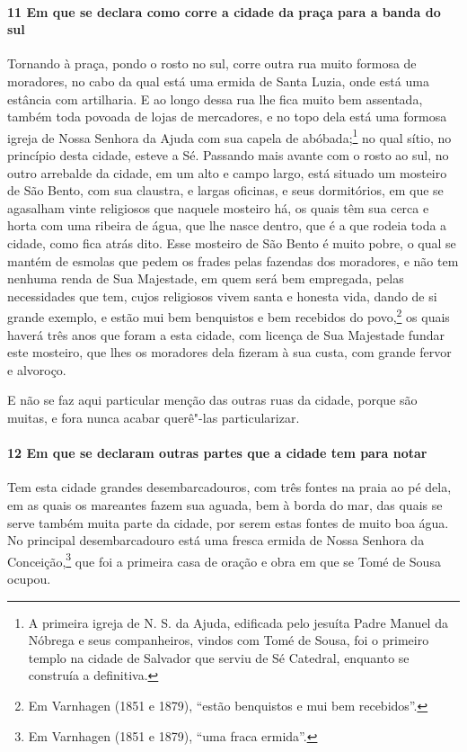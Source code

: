 \begin{linenumbers}
\paragraph{11 Em que se declara como corre a cidade da praça para a banda do sul} \quad
Tornando à praça, pondo o rosto no sul, corre outra rua muito formosa de moradores, no
cabo da qual está uma ermida de Santa Luzia, onde está uma estância com artilharia. E ao
longo dessa rua lhe fica muito bem assentada, também toda povoada de lojas de mercadores,
e no topo dela está uma formosa igreja de Nossa Senhora da Ajuda com sua capela de
abóbada;\footnote{ A primeira igreja de N. S. da Ajuda, edificada pelo jesuíta Padre
Manuel da Nóbrega e seus companheiros, vindos com Tomé de Sousa, foi o primeiro templo na
cidade de Salvador que serviu de Sé Catedral, enquanto se construía a definitiva.} no qual
sítio, no princípio desta cidade, esteve a Sé. Passando mais avante com o rosto ao sul, no
outro arrebalde da cidade, em um alto e campo largo, está situado um mosteiro de São
Bento, com sua claustra, e largas oficinas, e seus dormitórios, em que se agasalham vinte
religiosos que naquele mosteiro há, os quais têm sua cerca e horta com uma ribeira de
água, que lhe nasce dentro, que é a que rodeia toda a cidade, como fica atrás dito. Esse
mosteiro de São Bento é muito pobre, o qual se mantém de esmolas que pedem os frades pelas
fazendas dos moradores, e não tem nenhuma renda de Sua Majestade, em quem será bem
empregada, pelas necessidades que tem, cujos religiosos vivem santa e honesta vida, dando
de si grande exemplo, e estão mui bem benquistos e bem recebidos do povo,\footnote{ Em
Varnhagen (1851 e 1879), ``estão benquistos e mui bem recebidos''.} os quais haverá três
anos que foram a esta cidade, com licença de Sua Majestade fundar este mosteiro, que lhes
os moradores dela fizeram à sua custa, com grande fervor e alvoroço.

E não se faz aqui particular menção das outras ruas da cidade, porque são muitas, e fora
nunca acabar querê"-las particularizar.

\paragraph{12 Em que se declaram outras partes que a cidade tem para notar} \quad
Tem esta cidade grandes desembarcadouros, com três fontes na praia ao pé dela, em as quais
os mareantes fazem sua aguada, bem à borda do mar, das quais se serve também muita parte
da cidade, por serem estas fontes de muito boa água. No principal desembarcadouro está uma
fresca ermida de Nossa Senhora da Conceição,\footnote{ Em Varnhagen (1851 e 1879), ``uma
fraca ermida''.} que foi a primeira casa de oração e obra em que se Tomé de Sousa ocupou.


\end{linenumbers}
